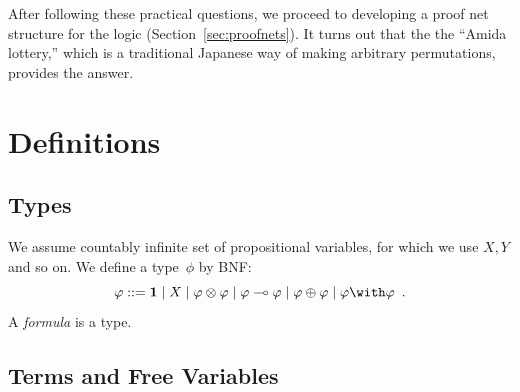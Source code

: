 After following these practical questions,
we proceed to developing a proof net structure for the logic
(Section~\ref{sec:proofnets}).
It turns out that the the ``Amida lottery,'' which is a traditional
Japanese way of making arbitrary permutations, provides the answer.



\section{Definitions}

\subsection{Types}
We assume countably infinite set of propositional variables, for which
we use $X,Y$ and so on.
We define a type~$\phi$ by BNF:
\[
 \phi::=\one \mid X \mid \phi\otimes\phi\mid \phi\limp\phi\mid
 \phi\oplus\phi\mid \phi\with\phi\enspace.
\]
A \textit{formula} is a type.

\subsection{Terms and Free Variables}

